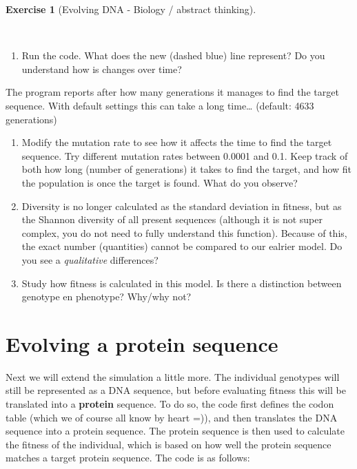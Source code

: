 \documentclass[
  letterpaper,
  DIV=11,
  numbers=noendperiod]{scrreprt}
\providecommand{\tightlist}{%
  \setlength{\itemsep}{0pt}\setlength{\parskip}{0pt}}\usepackage{longtable,booktabs,array}
\theoremstyle{definition}
\newtheorem{exercise}{Exercise}[chapter]
\theoremstyle{remark}
\begin{document}
\begin{exercise}[Evolving DNA - Biology / abstract
thinking]\protect\hypertarget{exr-evolving-dna}{}\label{exr-evolving-dna}

~

\begin{enumerate}
\def\labelenumi{\alph{enumi}.}
\tightlist
\item
  Run the code. What does the new (dashed blue) line represent? Do you
  understand how is changes over time?
\end{enumerate}

The program reports after how many generations it manages to find the
target sequence. With default settings this can take a long time\ldots{}
(default: 4633 generations)

\begin{enumerate}
\def\labelenumi{\alph{enumi}.}
\setcounter{enumi}{1}
\tightlist
\item
  Modify the mutation rate to see how it affects the time to find the
  target sequence. Try different mutation rates between 0.0001 and 0.1.
  Keep track of both how long (number of generations) it takes to find
  the target, and how fit the population is once the target is found.
  What do you observe?
\item
  Diversity is no longer calculated as the standard deviation in
  fitness, but as the Shannon diversity of all present sequences
  (although it is not super complex, you do not need to fully understand
  this function). Because of this, the exact number (quantities) cannot
  be compared to our ealrier model. Do you see a \emph{qualitative}
  differences?
\item
  Study how fitness is calculated in this model. Is there a distinction
  between genotype en phenotype? Why/why not?
\end{enumerate}

\end{exercise}

\section{Evolving a protein sequence}\label{evolving-a-protein-sequence}

Next we will extend the simulation a little more. The individual
genotypes will still be represented as a DNA sequence, but before
evaluating fitness this will be translated into a \textbf{protein}
sequence. To do so, the code first defines the codon table (which we of
course all know by heart =)), and then translates the DNA sequence into
a protein sequence. The protein sequence is then used to calculate the
fitness of the individual, which is based on how well the protein
sequence matches a target protein sequence. The code is as follows:
\end{document}
